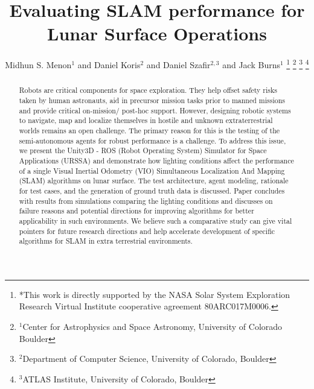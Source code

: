 \documentclass[a4paper, 10pt, conference]{ieeeconf}      %
\title{\LARGE \bf
Evaluating SLAM performance for Lunar Surface Operations
}
\author{Midhun S. Menon$^{1}$ and Daniel Koris$^{2}$ and Daniel Szafir$^{2,3}$ and Jack Burns$^{1}$%
\thanks{*This work is directly supported by the NASA Solar System Exploration Research Virtual Institute cooperative agreement 80ARC017M0006.}%
\thanks{$^{1}$Center for Astrophysics and Space Astronomy, University of Colorado Boulder}%
\thanks{$^{2}$Department of Computer Science, University of Colorado, Boulder}%
\thanks{$^{3}$ATLAS Institute, University of Colorado, Boulder}%
}
\begin{document}

\thispagestyle{empty}
\pagestyle{empty}


\begin{abstract}
Robots are critical components for space exploration. They help offset safety risks taken by human astronauts, aid in precursor mission tasks prior to manned missions and provide critical on-mission/ post-hoc support. However, designing robotic systems to navigate, map and localize themselves in hostile and unknown extraterrestrial worlds remains an open challenge. The primary reason for this is the testing of the semi-autonomous agents for robust performance is a challenge. To address this issue, we present the Unity3D - ROS (Robot Operating System) Simulator for Space Applications (URSSA) and demonstrate how lighting conditions affect the performance of a single Visual Inertial Odometry (VIO) Simultaneous Localization And Mapping (SLAM) algorithms on lunar surface. The test architecture, agent modeling, rationale for test cases, and the generation of ground truth data is discussed. Paper concludes with results from simulations comparing the lighting conditions and discusses on failure reasons and potential directions for improving algorithms for better applicability in such environments. We believe such a comparative study can give vital pointers for future research directions and help accelerate development of specific algorithms for SLAM in extra terrestrial environments.

\end{abstract}
\end{document}
